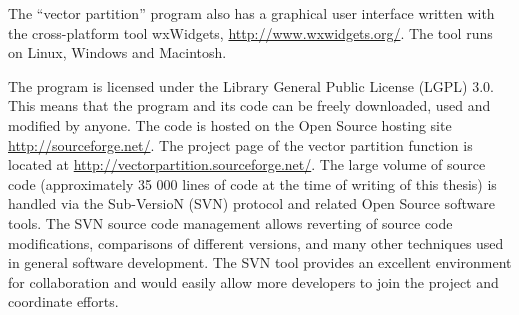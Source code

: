 \documentclass[12pt]{report}
\newtheorem{lemma}[theo]{Lemma}
\newenvironment{proof}[1][]{ \textbf{Proof#1. }}{$\Box$\medskip}
\newcommand{\kk}{\mathfrak{k}}
\newcommand{\hh}{\mathfrak{h}}
\newcommand{\gG}{\mathfrak{g}}
\renewcommand {\phi} {\varphi}
\begin{document}
The ``vector partition'' program also has a graphical user interface written with the cross-platform tool wxWidgets, \url{http://www.wxwidgets.org/}. The tool runs on Linux, Windows and Macintosh.

The program is licensed under the Library General Public License (LGPL) 3.0. This means that the program and its code can be freely downloaded, used and modified by anyone. The code is hosted on the Open Source hosting site  \url{http://sourceforge.net/}. The project page of the vector partition function is located at \url{http://vectorpartition.sourceforge.net/}. The large volume of source code (approximately 35 000 lines of code at the time of writing of this thesis) is handled via the Sub-VersioN (SVN) protocol and related Open Source software tools. The SVN source code management allows reverting of source code modifications, comparisons of different versions, and many other techniques used in general software development. The SVN tool provides an excellent environment for collaboration and would easily allow more developers to join the project and coordinate efforts.





 
\end{document}
